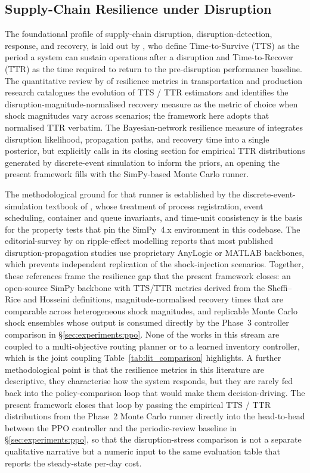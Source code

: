 \documentclass[review,preprint,authoryear,12pt]{elsarticle}
\begin{document}
\subsection{Supply-Chain Resilience under Disruption}
\label{sec:lit:resilience}

The foundational profile of supply-chain disruption,
disruption-detection, response, and recovery, is laid out by
\citet{sheffi2005resilient}, who define Time-to-Survive (TTS) as the
period a system can sustain operations after a disruption and
Time-to-Recover (TTR) as the time required to return to the
pre-disruption performance baseline. The quantitative review by
\citet{hosseini2019review} of resilience metrics in transportation
and production research catalogues the evolution of TTS / TTR
estimators and identifies the disruption-magnitude-normalised
recovery measure as the metric of choice when shock magnitudes vary
across scenarios; the framework here adopts that normalised TTR
verbatim. The Bayesian-network resilience measure of
\citet{hosseini2020resilience_measure} integrates disruption
likelihood, propagation paths, and recovery time into a single
posterior, but explicitly calls in its closing section for empirical
TTR distributions generated by discrete-event simulation to inform
the priors, an opening the present framework fills with the
SimPy-based Monte Carlo runner.

The methodological ground for that runner is established by the
discrete-event-simulation textbook of \citet{banks2010des}, whose
treatment of process registration, event scheduling, container and
queue invariants, and time-unit consistency is the basis for the
property tests that pin the SimPy~4.x environment in this codebase.
The editorial-survey by \citet{dolgui2021ripple} on ripple-effect
modelling reports that most published disruption-propagation studies
use proprietary AnyLogic or MATLAB backbones, which prevents
independent replication of the shock-injection scenarios. Together,
these references frame the resilience gap that the present framework
closes: an open-source SimPy backbone with TTS/TTR metrics derived
from the Sheffi--Rice and Hosseini definitions, magnitude-normalised
recovery times that are comparable across heterogeneous shock
magnitudes, and replicable Monte Carlo shock ensembles whose output
is consumed directly by the Phase~3 controller comparison in
\S\ref{sec:experiments:ppo}. None of the works in this stream are
coupled to a multi-objective routing planner or to a learned
inventory controller, which is the joint coupling
Table~\ref{tab:lit_comparison} highlights. A further methodological
point is that the resilience metrics in this literature are
descriptive, they characterise how the system responds, but they are
rarely fed back into the policy-comparison loop that would make them
decision-driving. The present framework closes that loop by passing
the empirical TTS / TTR distributions from the Phase~2 Monte Carlo
runner directly into the head-to-head between the PPO controller and
the periodic-review baseline in \S\ref{sec:experiments:ppo}, so that
the disruption-stress comparison is not a separate qualitative
narrative but a numeric input to the same evaluation table that
reports the steady-state per-day cost.
\end{document}
